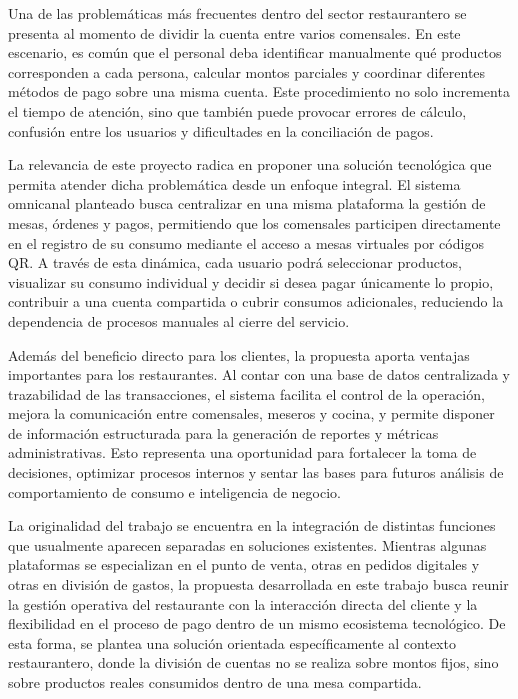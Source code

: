 \documentclass[12pt]{report}
\begin{document}
Una de las problemáticas más frecuentes dentro del sector restaurantero se presenta al momento de dividir la cuenta entre varios comensales. En este escenario, es común que el personal deba identificar manualmente qué productos corresponden a cada persona, calcular montos parciales y coordinar diferentes métodos de pago sobre una misma cuenta. Este procedimiento no solo incrementa el tiempo de atención, sino que también puede provocar errores de cálculo, confusión entre los usuarios y dificultades en la conciliación de pagos.

La relevancia de este proyecto radica en proponer una solución tecnológica que permita atender dicha problemática desde un enfoque integral. El sistema omnicanal planteado busca centralizar en una misma plataforma la gestión de mesas, órdenes y pagos, permitiendo que los comensales participen directamente en el registro de su consumo mediante el acceso a mesas virtuales por códigos QR. A través de esta dinámica, cada usuario podrá seleccionar productos, visualizar su consumo individual y decidir si desea pagar únicamente lo propio, contribuir a una cuenta compartida o cubrir consumos adicionales, reduciendo la dependencia de procesos manuales al cierre del servicio.

Además del beneficio directo para los clientes, la propuesta aporta ventajas importantes para los restaurantes. Al contar con una base de datos centralizada y trazabilidad de las transacciones, el sistema facilita el control de la operación, mejora la comunicación entre comensales, meseros y cocina, y permite disponer de información estructurada para la generación de reportes y métricas administrativas. Esto representa una oportunidad para fortalecer la toma de decisiones, optimizar procesos internos y sentar las bases para futuros análisis de comportamiento de consumo e inteligencia de negocio.

La originalidad del trabajo se encuentra en la integración de distintas funciones que usualmente aparecen separadas en soluciones existentes. Mientras algunas plataformas se especializan en el punto de venta, otras en pedidos digitales y otras en división de gastos, la propuesta desarrollada en este trabajo busca reunir la gestión operativa del restaurante con la interacción directa del cliente y la flexibilidad en el proceso de pago dentro de un mismo ecosistema tecnológico. De esta forma, se plantea una solución orientada específicamente al contexto restaurantero, donde la división de cuentas no se realiza sobre montos fijos, sino sobre productos reales consumidos dentro de una mesa compartida.
\end{document}
